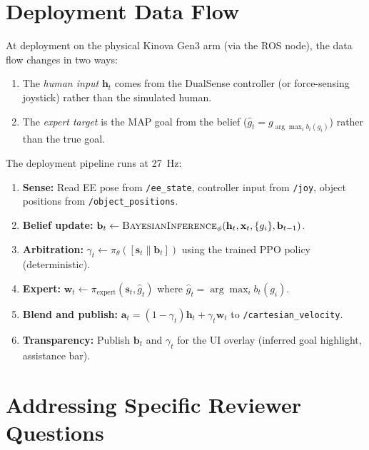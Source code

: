\documentclass[11pt]{article}
\newcommand{\bvec}{\mathbf{b}_t}
\newcommand{\svec}{\mathbf{s}_t}
\newcommand{\hvec}{\mathbf{h}_t}
\newcommand{\wvec}{\mathbf{w}_t}
\newcommand{\avec}{\mathbf{a}_t}
\begin{document}
\section{Deployment Data Flow}
\label{sec:deployment}

At deployment on the physical Kinova Gen3 arm (via the ROS node), the data flow changes in two ways:
\begin{enumerate}
    \item The \emph{human input} $\hvec$ comes from the DualSense controller (or force-sensing joystick) rather than the simulated human.
    \item The \emph{expert target} is the MAP goal from the belief ($\hat{g}_t = g_{\arg\max_i b_t(g_i)}$) rather than the true goal.
\end{enumerate}

\noindent The deployment pipeline runs at 27~Hz:

\begin{enumerate}
    \item \textbf{Sense:} Read EE pose from \texttt{/ee\_state}, controller input from \texttt{/joy}, object positions from \texttt{/object\_positions}.
    \item \textbf{Belief update:} $\bvec \gets \textsc{BayesianInference}_\phi(\hvec, \mathbf{x}_t, \{g_i\}, \mathbf{b}_{t-1})$.
    \item \textbf{Arbitration:} $\gamma_t \gets \pi_\theta([\svec \| \bvec])$ using the trained PPO policy (deterministic).
    \item \textbf{Expert:} $\wvec \gets \pi_{\text{expert}}(\svec, \hat{g}_t)$ where $\hat{g}_t = \arg\max_i b_t(g_i)$.
    \item \textbf{Blend and publish:} $\avec = (1-\gamma_t)\hvec + \gamma_t \wvec$ to \texttt{/cartesian\_velocity}.
    \item \textbf{Transparency:} Publish $\bvec$ and $\gamma_t$ for the UI overlay (inferred goal highlight, assistance bar).
\end{enumerate}


\section{Addressing Specific Reviewer Questions}
\label{sec:reviewer-questions}
\end{document}
